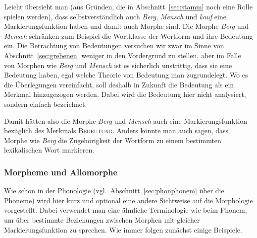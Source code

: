 Leicht übersieht man (aus Gründen, die in Abschnitt~\ref{sec:stamm} noch eine Rolle spielen werden), dass selbstverständlich auch \textit{Berg}, \textit{Mensch} und \textit{kauf} eine Markierungsfunktion haben und damit auch Morphe sind.
Die Morphe \textit{Berg} und \textit{Mensch} schränken zum Beispiel die Wortklasse der Wortform und ihre Bedeutung ein.
Die Betrachtung von Bedeutungen versuchen wir zwar im Sinne von Abschnitt~\ref{sec:grebenen} weniger in den Vordergrund zu stellen, aber im Falle von Morphen wie \textit{Berg} und \textit{Mensch} ist es sicherlich unstrittig, dass sie eine Bedeutung haben, egal welche Theorie von Bedeutung man zugrundelegt.
Wo es die Überlegungen vereinfacht, soll deshalb in Zukunft die Bedeutung als ein Merkmal hinzugezogen werden.
Dabei wird die Bedeutung hier nicht analysiert, sondern einfach bezeichnet.

\begin{exe}
\end{exe}

Damit hätten also die Morphe \textit{Berg} und \textit{Mensch} auch eine Markierungsfunktion bezüglich des Merkmals \textsc{Bedeutung}.
Anders könnte man auch sagen, dass Morphe wie \textit{Berg} die Zugehörigkeit der Wortform zu einem bestimmten lexikalischen Wort markieren.

\subsubsection[Morpheme und Allomorphe]{\Opsional Morpheme und Allomorphe}

\label{sec:morphemallo}

Wie schon in der Phonologie (vgl.\ Abschnitt~\ref{sec:phonphonem} über die Phoneme) wird hier kurz und optional eine andere Sichtweise auf die Morphologie vorgestellt.
Dabei verwendet man eine ähnliche Terminologie wie beim Phonem, um über bestimmte Beziehungen zwischen Morphen mit gleicher Markierungsfunktion zu sprechen.
Wie immer folgen zunächst einige Beispiele.

\enlargethispage{1\baselineskip}
\begin{exe}
  \ex\label{ex:morph7281}
  \begin{xlist}
  \end{xlist}
  \ex\label{ex:morph7282}
  \begin{xlist}
  \end{xlist}
  \ex\label{ex:morph7283}
  \begin{xlist}
  \end{xlist}
\end{exe}

